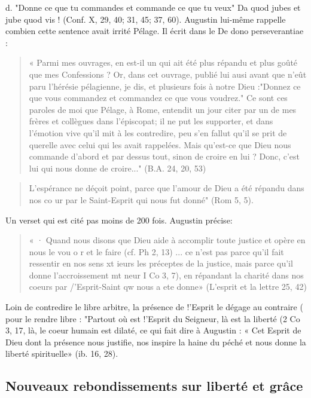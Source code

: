 d.	"Donne ce que tu commandes et commande ce que tu veux" Da quod jubes et jube quod vis ! (Conf. X, 29, 40; 31, 45; 37, 60). Augustin lui-même rappelle combien cette sentence avait irrité Pélage. Il écrit dans le De dono perseverantiae :
\begin{quote}
    « Parmi mes ouvrages, en est-il un qui ait été plus répandu et plus goûté que mes Confessions ? Or, dans cet ouvrage, publié lui ausi avant que n'eût paru l'hérésie pélagienne, je dis, et plusieurs fois à notre Dieu :"Donnez ce que vous commandez et commandez ce que vous voudrez." Ce sont ces paroles de moi que Pélage, à Rome, entendit un jour citer par un de mes frères et collègues dans l'épiscopat; il ne put les supporter, et dans l'émotion vive qu'il mit à les contredire, peu s'en fallut qu'il se prit de querelle avec celui qui les avait rappelées. Mais qu'est-ce que Dieu nous commande d'abord et par dessus tout, sinon de croire en lui ? Donc, c'est lui qui nous donne de croire..." (B.A. 24, 20, 53)
\end{quote}


\begin{quote}
    L'espérance ne déçoit point, parce que l'amour de Dieu a été répandu dans nos co ur par le Saint-Esprit qui nous fut donné" (Rom 5, 5). 
\end{quote}
Un verset qui est cité pas moins de 200 fois. Augustin précise:
\begin{quote}
    « · Quand nous disons que Dieu aide à accomplir toute justice et opère en nous le vou o r et le faire (cf. Ph 2, 13) ... ce n'est pas parce qu'il fait ressentir en nos sens xt ieurs les préceptes  de la justice, mais parce qu'il donne l'accroissement mt neur   I Co 3, 7), en répandant la charité dans nos coeurs par /'Esprit-Saint
qw nous a ete donne» (L'esprit et la lettre 25, 42)

\end{quote}

 
 
Loin de contredire le libre arbitre, la présence de !'Esprit le dégage au contraire	( pour le rendre libre : "Partout où est !'Esprit du Seigneur, là est la liberté (2 Co 3,
17, là, le coeur humain est dilaté, ce qui fait dire à Augustin : « Cet Esprit de Dieu dont
la présence nous justifie, nos inspire la haine du péché et nous donne la liberté spirituelle» (ib. 16, 28).

\subsection{Nouveaux	rebondissements sur liberté et	grâce}
 

